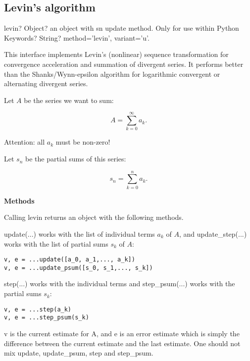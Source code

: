 \subsection{Levin's algorithm}

\begin{mpFunctionsExtract}
	\mpFunctionOne
	{levin? Object? an object with sn update method. Only for use within Python}
	{Keywords? String? method='levin', variant='u'.}	
\end{mpFunctionsExtract}


\vpara
This interface implements Levin's (nonlinear) sequence transformation for convergence acceleration and summation of divergent series. It performs better than the Shanks/Wynn-epsilon algorithm for logarithmic convergent or alternating divergent series.

Let $A$ be the series we want to sum:

\begin{equation}
A=\sum_{k=0}^{\infty} a_k.
\end{equation}

Attention: all $a_k$ must be non-zero!

Let $s_n$ be the partial sums of this series:

\begin{equation}
s_n = \sum_{k=0}^n a_k.
\end{equation}

\vpara
\textbf{Methods}

Calling levin returns an object with the following methods.

update(...) works with the list of individual terms $a_k$ of $A$, and update\_step(...) works with the list of partial sums $s_k$ of $A$:

\begin{lstlisting}
v, e = ...update([a_0, a_1,..., a_k])
v, e = ...update_psum([s_0, s_1,..., s_k])
\end{lstlisting}

step(...) works with the individual terms and step\_psum(...) works with the partial sums $s_k$:

\begin{lstlisting}
v, e = ...step(a_k)
v, e = ...step_psum(s_k)
\end{lstlisting}

v is the current estimate for A, and e is an error estimate which is simply the difference between the current estimate and the last estimate. One should not mix update, update\_psum, step and step\_psum.

